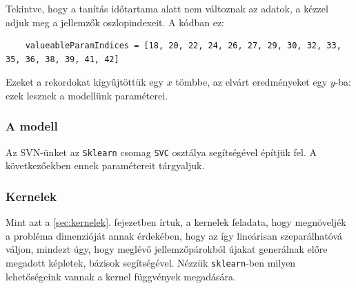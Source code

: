 Tekintve, hogy a tanítás időtartama alatt nem változnak az adatok, a kézzel adjuk
meg a jellemzők oszlopindexeit. A kódban ez:
\begin{lstlisting}  
	valueableParamIndices = [18, 20, 22, 24, 26, 27, 29, 30, 32, 33, 35, 36, 38, 39, 41, 42]
\end{lstlisting}

Ezeket a rekordokat kigyűjtöttük egy $ x $ tömbbe, az elvárt eredményeket egy $ y $-ba:
ezek lesznek a modellünk paraméterei.



\subsubsection{A modell}

Az SVN-ünket az \texttt{Sklearn} csomag \texttt{SVC} osztálya segítségével építjük fel. A következőekben ennek paramétereit tárgyaljuk.

%
%
%
%




\subsubsection{Kernelek}


Mint azt a \ref{sec:kernelek}. fejezetben írtuk, a kernelek feladata, hogy megnöveljék a probléma
dimenzióját annak érdekében, hogy az így lineárisan szeparálhatóvá váljon, mindezt 
úgy, hogy meglévő jellemzőpárokból újakat generálnak előre megadott képletek,
bázisok segítségével. Nézzük \texttt{sklearn}-ben milyen lehetőségeink vannak a 
kernel függvények megadására.

